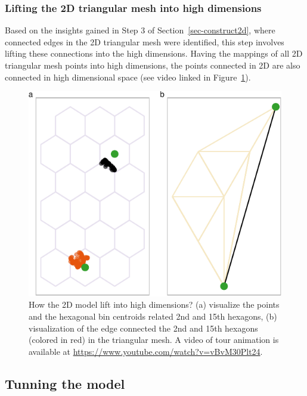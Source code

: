 \documentclass[
  12pt]{article}
\begin{document}
\hypertarget{lifting-the-2d-triangular-mesh-into-high-dimensions}{%
\subsubsection{Lifting the 2D triangular mesh into high
dimensions}\label{lifting-the-2d-triangular-mesh-into-high-dimensions}}

Based on the insights gained in Step 3 of Section~\ref{sec-construct2d},
where connected edges in the 2D triangular mesh were identified, this
step involves lifting these connections into the high dimensions. Having
the mappings of all 2D triangular mesh points into high dimensions, the
points connected in 2D are also connected in high dimensional space (see
video linked in Figure~\ref{fig-wkhighD}).

\begin{figure}

{\centering \includegraphics{paper_files/figure-pdf/fig-wkhighD-1.pdf}

}

\caption{\label{fig-wkhighD}How the 2D model lift into high dimensions?
(a) visualize the points and the hexagonal bin centroids related 2nd and
15th hexagons, (b) visualization of the edge connected the 2nd and 15th
hexagons (colored in red) in the triangular mesh. A video of tour
animation is available at
\url{https://www.youtube.com/watch?v=vBvM30Plt24}.}

\end{figure}

\hypertarget{tunning-the-model}{%
\subsection{Tunning the model}\label{tunning-the-model}}
\end{document}

